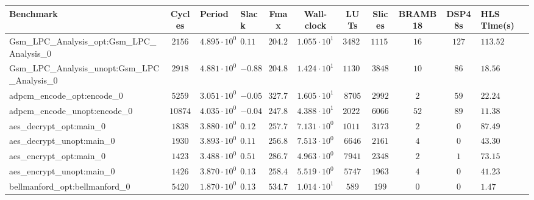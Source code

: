 \begin{tabular}{|l|c|HHc|c|c|c|c|cH|}
\hline
Benchmark                                       & Cycles       & Period                 & Slack     & Fmax       & Wall-clock              & LUTs       & Slices    & BRAMB18 & DSP48s  & HLS Time(s) \\
\hline
Gsm\_LPC\_Analysis\_opt:Gsm\_LPC\_Analysis\_0   & $ 2156     $ & $ 4.895 \cdot 10^{0} $ & $ 0.11  $ & $ 204.29 $ & $ 1.055 \cdot 10^{1}  $ & $ 34820  $ & $ 11151 $ & $ 16  $ & $ 127 $ & $ 113.52  $ \\
Gsm\_LPC\_Analysis\_unopt:Gsm\_LPC\_Analysis\_0 & $ 2918     $ & $ 4.881 \cdot 10^{0} $ & $ -0.88 $ & $ 204.88 $ & $ 1.424 \cdot 10^{1}  $ & $ 11305  $ & $ 3848  $ & $ 10  $ & $ 86  $ & $ 18.56   $ \\
adpcm\_encode\_opt:encode\_0                    & $ 5259     $ & $ 3.051 \cdot 10^{0} $ & $ -0.05 $ & $ 327.76 $ & $ 1.605 \cdot 10^{1}  $ & $ 8705   $ & $ 2992  $ & $ 2   $ & $ 59  $ & $ 22.24   $ \\
adpcm\_encode\_unopt:encode\_0                  & $ 10874    $ & $ 4.035 \cdot 10^{0} $ & $ -0.04 $ & $ 247.83 $ & $ 4.388 \cdot 10^{1}  $ & $ 20227  $ & $ 6066  $ & $ 52  $ & $ 89  $ & $ 11.38   $ \\
aes\_decrypt\_opt:main\_0                       & $ 1838     $ & $ 3.880 \cdot 10^{0} $ & $ 0.12  $ & $ 257.73 $ & $ 7.131 \cdot 10^{0}  $ & $ 10116  $ & $ 3173  $ & $ 2   $ & $ 0   $ & $ 87.49   $ \\
aes\_decrypt\_unopt:main\_0                     & $ 1930     $ & $ 3.893 \cdot 10^{0} $ & $ 0.11  $ & $ 256.87 $ & $ 7.513 \cdot 10^{0}  $ & $ 6646   $ & $ 2161  $ & $ 4   $ & $ 0   $ & $ 43.30   $ \\
aes\_encrypt\_opt:main\_0                       & $ 1423     $ & $ 3.488 \cdot 10^{0} $ & $ 0.51  $ & $ 286.70 $ & $ 4.963 \cdot 10^{0}  $ & $ 7941   $ & $ 2348  $ & $ 2   $ & $ 1   $ & $ 73.15   $ \\
aes\_encrypt\_unopt:main\_0                     & $ 1426     $ & $ 3.870 \cdot 10^{0} $ & $ 0.13  $ & $ 258.40 $ & $ 5.519 \cdot 10^{0}  $ & $ 5747   $ & $ 1963  $ & $ 4   $ & $ 0   $ & $ 41.23   $ \\
bellmanford\_opt:bellmanford\_0                 & $ 5420     $ & $ 1.870 \cdot 10^{0} $ & $ 0.13  $ & $ 534.76 $ & $ 1.014 \cdot 10^{1}  $ & $ 589    $ & $ 199   $ & $ 0   $ & $ 0   $ & $ 1.47    $ \\

\end{tabular}
